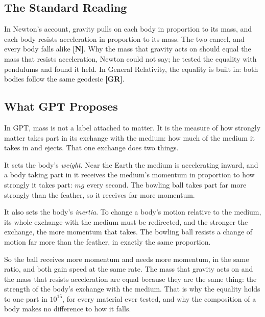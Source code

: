 \documentclass[11pt,a4paper]{article}
\newcommand{\reg}[1]{\textsf{\small\textbf{[#1]}}}
\newcommand{\RN}{\reg{N}}
\newcommand{\RGR}{\reg{GR}}
\begin{document}
\subsection*{The Standard Reading}

In Newton's account, gravity pulls on each body in proportion to its mass, and each body resists acceleration in proportion to its mass. The two cancel, and every body falls alike \RN{}. Why the mass that gravity acts on should equal the mass that resists acceleration, Newton could not say; he tested the equality with pendulums and found it held. In General Relativity, the equality is built in: both bodies follow the same geodesic \RGR{}.


\subsection*{What GPT Proposes}

\begin{hypbar}
In GPT, mass is not a label attached to matter. It is the measure of how strongly matter takes part in its exchange with the medium: how much of the medium it takes in and ejects.\footnotemark{} That one exchange does two things.

It sets the body's \emph{weight}. Near the Earth the medium is accelerating inward, and a body taking part in it receives the medium's momentum in proportion to how strongly it takes part: $mg$ every second. The bowling ball takes part far more strongly than the feather, so it receives far more momentum.

It also sets the body's \emph{inertia}. To change a body's motion relative to the medium, its whole exchange with the medium must be redirected, and the stronger the exchange, the more momentum that takes. The bowling ball resists a change of motion far more than the feather, in exactly the same proportion.

So the ball receives more momentum and needs more momentum, in the same ratio, and both gain speed at the same rate. The mass that gravity acts on and the mass that resists acceleration are equal because they are the same thing: the strength of the body's exchange with the medium. That is why the equality holds to one part in $10^{15}$, for every material ever tested, and why the composition of a body makes no difference to how it falls.
\end{hypbar}
\end{document}
